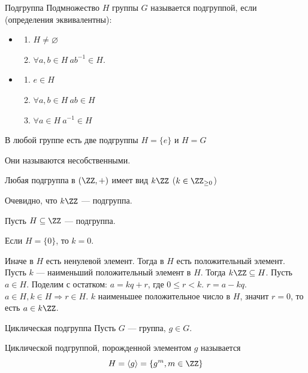 \begin{defn}{Подгруппа}{}
    Подмножество \( H \) группы \( G \) называется подгруппой,
    если (определения эквивалентны):
    \begin{itemize}
        \item
            \begin{enumerate}
                \item
                    \( H \neq \varnothing \)
                \item
                    \( \forall a, b \in H \: ab^{-1} \in H \).
            \end{enumerate}
        \item
            \begin{enumerate}
                \item
                    \( e \in H\)
                \item
                    \( \forall a, b \in H \: ab \in H \)
                \item
                    \( \forall a \in H \: a^{-1} \in H \)
            \end{enumerate}
    \end{itemize}
\end{defn}

\begin{remark}{}{}
    В любой группе есть две подгруппы \( H = \{ e \} \) и \( H = G \)

    Они называются несобственными.
\end{remark}

\begin{prop}{}{}
    Любая подгруппа в \( (\ZZ, +) \) имеет вид \( k \ZZ \) (\( k \in \ZZ_{\geq 0} \))
\end{prop}

Очевидно, что \( k \ZZ \) --- подгруппа.

Пусть \( H \subseteq \ZZ \) --- подгруппа.

Если \( H = \{ 0 \} \), то \( k = 0 \).

Иначе в \( H \) есть ненулевой элемент.
Тогда в \( H \) есть положительный элемент.
Пусть \( k \) --- наименьший положительный элемент в \( H \).
Тогда \( k \ZZ \subseteq H \).
Пусть \( a \in H \).
Поделим с остатком: \( a = kq + r \), где \( 0 \leq r < k \).
\( r = a - kq \). \( a \in H, k \in H \Rightarrow r \in H \).
\( k \) наименьшее положительное число в \( H \), значит \( r = 0 \),
то есть \( a \in k \ZZ \).

\begin{defn}{Циклическая подгруппа}{}
    Пусть \( G \) --- группа, \( g \in G \).

    Циклической подгруппой,
    порожденной элементом \( g \) называется
    \[
        H = \langle g \rangle = \{ g^m, m \in \ZZ \}
    \]
\end{defn}

